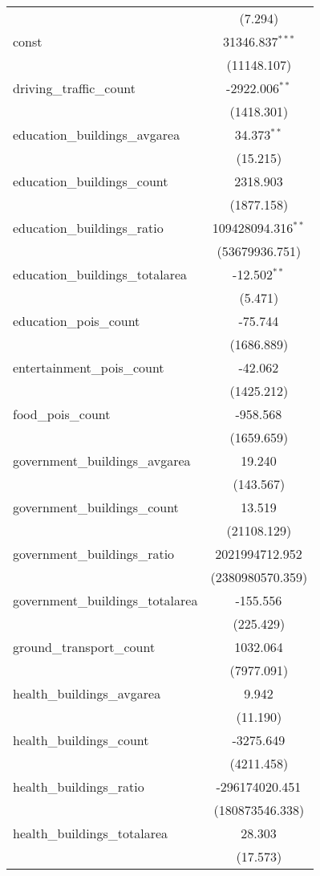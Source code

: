 \begin{table}[!htbp]
\begin{tabular}{@{\extracolsep{5pt}}lc}
  & (7.294) \\
 const & 31346.837$^{***}$ \\
  & (11148.107) \\
 driving_traffic_count & -2922.006$^{**}$ \\
  & (1418.301) \\
 education_buildings_avgarea & 34.373$^{**}$ \\
  & (15.215) \\
 education_buildings_count & 2318.903$^{}$ \\
  & (1877.158) \\
 education_buildings_ratio & 109428094.316$^{**}$ \\
  & (53679936.751) \\
 education_buildings_totalarea & -12.502$^{**}$ \\
  & (5.471) \\
 education_pois_count & -75.744$^{}$ \\
  & (1686.889) \\
 entertainment_pois_count & -42.062$^{}$ \\
  & (1425.212) \\
 food_pois_count & -958.568$^{}$ \\
  & (1659.659) \\
 government_buildings_avgarea & 19.240$^{}$ \\
  & (143.567) \\
 government_buildings_count & 13.519$^{}$ \\
  & (21108.129) \\
 government_buildings_ratio & 2021994712.952$^{}$ \\
  & (2380980570.359) \\
 government_buildings_totalarea & -155.556$^{}$ \\
  & (225.429) \\
 ground_transport_count & 1032.064$^{}$ \\
  & (7977.091) \\
 health_buildings_avgarea & 9.942$^{}$ \\
  & (11.190) \\
 health_buildings_count & -3275.649$^{}$ \\
  & (4211.458) \\
 health_buildings_ratio & -296174020.451$^{}$ \\
  & (180873546.338) \\
 health_buildings_totalarea & 28.303$^{}$ \\
  & (17.573) \\

\end{tabular}
\end{table}

